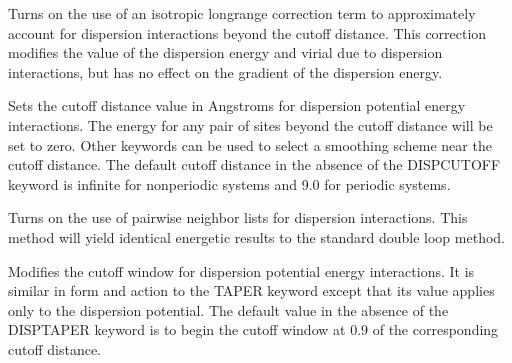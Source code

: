 \documentclass[letterpaper,11pt,english]{sphinxmanual}
\begin{document}
\ignorespaces {}\label{\detokenize{text/keywords:key-disp-correction}}\begin{description}
\sphinxAtStartPar
Turns on the use of an isotropic long\sphinxhyphen{}range correction term to approximately account for dispersion interactions beyond the cutoff distance. This correction modifies the value of the dispersion energy and virial due to dispersion interactions, but has no effect on the gradient of the dispersion energy.

\end{description}

\ignorespaces {}\label{\detokenize{text/keywords:key-disp-cutoff}}\begin{description}
\sphinxAtStartPar
Sets the cutoff distance value in Angstroms for dispersion potential energy interactions. The energy for any pair of sites beyond the cutoff distance will be set to zero. Other keywords can be used to select a smoothing scheme near the cutoff distance. The default cutoff distance in the absence of the DISP\sphinxhyphen{}CUTOFF keyword is infinite for nonperiodic systems and 9.0 for periodic systems.

\end{description}

\ignorespaces {}\label{\detokenize{text/keywords:key-disp-list}}\begin{description}
\sphinxAtStartPar
Turns on the use of pairwise neighbor lists for dispersion interactions. This method will yield identical energetic results to the standard double loop method.

\end{description}

\ignorespaces {}\label{\detokenize{text/keywords:key-disp-taper}}\begin{description}
\sphinxAtStartPar
Modifies the cutoff window for dispersion potential energy interactions. It is similar in form and action to the TAPER keyword except that its value applies only to the dispersion potential. The default value in the absence of the DISP\sphinxhyphen{}TAPER keyword is to begin the cutoff window at 0.9 of the corresponding cutoff distance.

\end{description}
\end{document}
